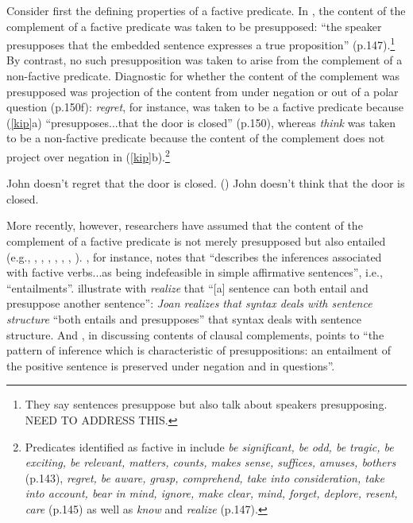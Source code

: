 \documentclass[11pt,fleqn]{article}
\newcommand{\6}{\mbox{$[\hspace*{-.6mm}[$}}
\newcommand{\9}{\mbox{$]\hspace*{-.6mm}]$}}
\begin{document}
Consider first the defining properties of a factive predicate. In \citealt{kiparsky-kiparsky70}, the content of the complement of a factive predicate was taken to be presupposed: ``the speaker presupposes that the embedded sentence expresses a true proposition'' (p.147).\footnote{They say sentences presuppose but also talk about speakers presupposing. NEED TO ADDRESS THIS.} By contrast, no such presupposition was taken to arise from the complement of a non-factive predicate. Diagnostic for whether the content of the complement was presupposed was projection of the content from under negation or out of a polar question (p.150f): {\em regret}, for instance, was taken to be a factive predicate because (\ref{kip}a) ``presupposes...that the door is closed'' (p.150),  whereas {\em think} was taken to be a non-factive predicate because the content of the complement does not project over negation in (\ref{kip}b).\footnote{Predicates identified as factive in \citealt{kiparsky-kiparsky70} include {\em be significant, be odd, be tragic, be exciting, be relevant, matters, counts, makes sense, suffices, amuses, bothers} (p.143), {\em regret, be aware, grasp, comprehend, take into consideration, take into account, bear in mind, ignore, make clear, mind, forget, deplore, resent, care} (p.145) as well as {\em know} and {\em realize} (p.147).}  

\begin{exe}
\ex\label{kip}
\begin{xlist}
\ex John doesn't regret that the door is closed. \hfill (\citealt[150]{kiparsky-kiparsky70})
\ex John doesn't think that the door is closed.
\end{xlist}
\end{exe}

More recently, however, researchers have assumed that the content of the complement of a factive predicate is not merely presupposed but also entailed (e.g., \citealt[119-123]{gazdar79a}, \citealt[355]{ccmg90}, \citealt[345]{vds92},  \citealt[3]{abbott06}, \citealt[139]{schlenker10}, \citealt[77]{anand-hacquard2014}, \citealt[fn.7]{spector-egre2015}). \citet[66f.]{beaver01}, for instance, notes that \citet[119-123]{gazdar79a} ``describes the inferences associated with factive verbs...as being indefeasible in simple affirmative sentences'', i.e., ``entailments''. \citet[355]{ccmg90} illustrate with {\em realize} that ``[a] sentence can both entail and presuppose another sentence'': {\em Joan realizes that syntax deals with sentence structure} ``both entails and presupposes'' that syntax deals with sentence structure. And \citet[139]{schlenker10}, in discussing contents of clausal complements, points to ``the pattern of inference which is characteristic of presuppositions: an entailment of the positive sentence is preserved under negation and in questions''.
\end{document}
